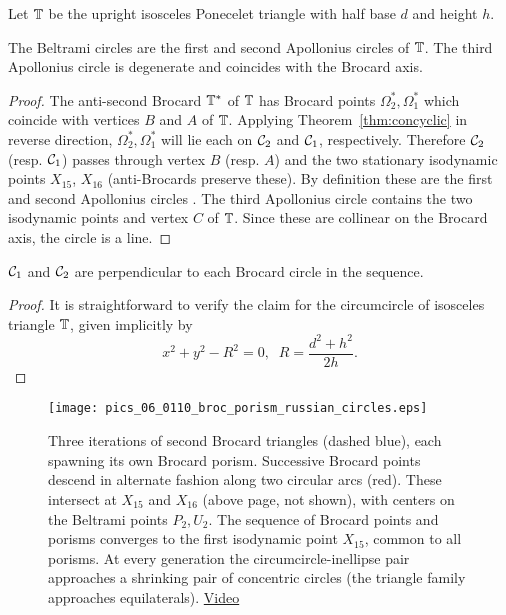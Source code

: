 Let $\mathbb{T}$ be the upright isosceles Ponecelet triangle with half base $d$ and height $h$.

\begin{corollary}
The Beltrami circles are the first and second Apollonius circles of $\mathbb{T}$. The third Apollonius circle is degenerate and coincides with the Brocard axis.
\end{corollary}

\begin{proof}
The anti-second Brocard $\mathbb{T}^*$ of $\mathbb{T}$ has Brocard points $\Omega_2^*,\Omega_1^*$ which coincide with vertices $B$ and $A$ of $\mathbb{T}$. Applying Theorem~\ref{thm:concyclic} in reverse direction, $\Omega_2^*,\Omega_1^*$ will lie each on $\mathcal{C}_2$ and $\mathcal{C}_1$, respectively. Therefore $\mathcal{C}_2$ (resp. $\mathcal{C}_1$) passes through vertex $B$ (resp. $A$) and the two stationary isodynamic points $X_{15}$, $X_{16}$ (anti-Brocards preserve these). By definition these are the first and second Apollonius circles \cite[Isodynamic Points]{mw}. The third Apollonius circle contains the two isodynamic points and vertex $C$ of $\mathbb{T}$. Since these are collinear on the Brocard axis, the circle is a line.
\end{proof}


\begin{proposition}
$\mathcal{C}_1$ and $\mathcal{C}_2$ are perpendicular to each Brocard circle in the sequence.
\end{proposition}
\begin{proof}
It is straightforward to verify the claim for the circumcircle of isosceles triangle $\mathbb{T}$, given implicitly by
\[ x^2+y^2-R^2=0, \;\; R=\frac{d^2+h^2}{2 h}.\]
\end{proof}
\begin{figure}
    \centering
 \texttt{[image: pics\_06\_0110\_broc\_porism\_russian\_circles.eps]}
    \caption{Three iterations of second Brocard triangles (dashed blue), each spawning its own Brocard porism. Successive Brocard points descend in alternate fashion along two circular arcs (red). These intersect at $X_{15}$ and  $X_{16}$ (above page, not shown), with centers on the Beltrami points $P_2,U_2$. The sequence of Brocard points and porisms converges to the first isodynamic point $X_{15}$, common to all porisms. At every generation the circumcircle-inellipse pair approaches a shrinking pair of concentric circles (the triangle family approaches equilaterals).  \href{https://youtu.be/Z3YlEbCFbnA}{Video}}
    \label{fig:russian-dolls}
\end{figure}

